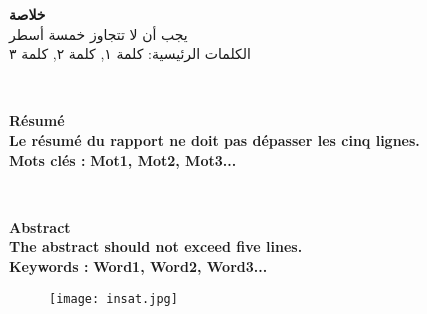 \documentclass[oneside,12pt]{Classes/aesm_edspia}
\begin{document}
\setlength{\parindent}{0pt}
\setlength{\topmargin}{0mm}
\setlength{\headheight}{0cm} 
\setlength{\headsep}{0cm}
\setlength{\textheight}{20cm}
\setlength{\textwidth}{17cm} 
\setlength{\marginparsep}{0cm} 
\setlength{\marginparwidth}{0cm}
\setlength{\headheight}{0cm} 
\setlength{\footskip}{0cm}

\pagestyle{fancy}


\begin{center}
\hbox{\raisebox{0.2em}{\vrule depth 0pt height 1pt width 17cm}}
\end{center}
\begin{minipage}[c]{\textwidth}
  \textbf{خلاصة}\\ [0.4cm]
\footnotesize 
يجب أن لا تتجاوز خمسة أسطر \\[0.4cm]
الكلمات الرئيسية:
    كلمة ١, كلمة ٢, كلمة ٣
\end{minipage}
\\[1.5cm]
\begin{center}
\hbox{\raisebox{0.2em}{\vrule depth 0pt height 1pt width 17cm}}
\end{center}
\begin{minipage}[c]{\textwidth}
\textbf{Résumé}\\[0.4cm]
\footnotesize
\textbf{Le résumé du rapport ne doit pas dépasser les cinq lignes.}  
\\[0.4cm]
\textbf{Mots clés :} \textbf{Mot1, Mot2, Mot3...}
\end{minipage}
\\[1.5cm]
\begin{center}
\hbox{\raisebox{0.2em}{\vrule depth 0pt height 1pt width 17cm}}
\end{center}
\begin{minipage}[c]{\textwidth}
\textbf{Abstract}\\[0.4cm]
\footnotesize
\textbf{The abstract should not exceed five lines. }
\\[0.4cm]
\textbf{Keywords :} \textbf{Word1, Word2, Word3...}
\end{minipage}%
\begin{center}
\begin{figure}
\texttt{[image: insat.jpg]}
\end{figure}
\end{center}

\renewcommand{\footrulewidth}{1pt}
\fancyfoot[L]{}
\fancyfoot[R]{}
\end{document}
